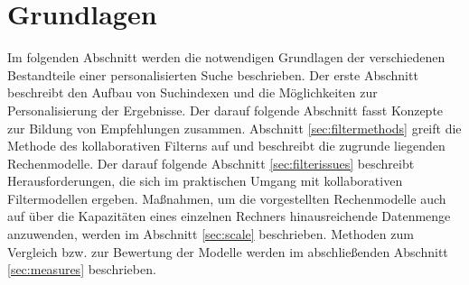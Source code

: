 \section{Grundlagen}\label{sec:basics} %

Im folgenden Abschnitt werden die notwendigen Grundlagen der verschiedenen Bestandteile einer personalisierten Suche beschrieben. Der erste Abschnitt beschreibt den Aufbau von Suchindexen und die Möglichkeiten zur Personalisierung der Ergebnisse. Der darauf folgende Abschnitt fasst Konzepte zur Bildung von Empfehlungen zusammen. Abschnitt \ref{sec:filtermethods} greift die Methode des kollaborativen Filterns auf und beschreibt die zugrunde liegenden Rechenmodelle. Der darauf folgende Abschnitt \ref{sec:filterissues} beschreibt Herausforderungen, die sich im praktischen Umgang mit kollaborativen Filtermodellen ergeben. Maßnahmen, um die vorgestellten Rechenmodelle auch auf über die Kapazitäten eines einzelnen Rechners hinausreichende Datenmenge anzuwenden, werden im Abschnitt \ref{sec:scale} beschrieben. Methoden zum Vergleich bzw. zur Bewertung der Modelle werden im abschließenden Abschnitt \ref{sec:measures}  beschrieben.







